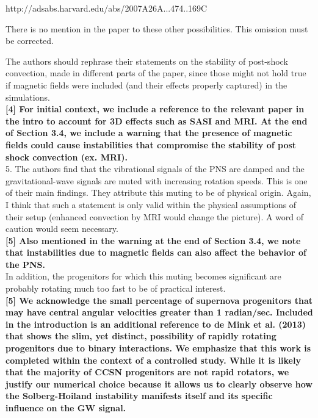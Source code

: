 \documentclass[11pt]{article}
\begin{document}
http://adsabs.harvard.edu/abs/2007A26A...474..169C

There is no mention in the paper to these other possibilities. This omission 
must be corrected.

The authors should rephrase their statements on the stability of post-shock 
convection, made in different parts of the paper, since those might not hold 
true if magnetic fields were included (and their effects properly captured) 
in the simulations.\\

\textbf{[4] For initial context, we include a reference to the relevant paper in the intro to account for 3D effects such as SASI and MRI.   At the end of Section 3.4, we include a warning that the presence of magnetic fields could cause instabilities that compromise the stability of post shock convection (ex. MRI).  }\\

5. The authors find that the vibrational signals of the PNS are damped and 
the gravitational-wave signals are muted with increasing rotation speeds. This
is one of their main findings. They attribute this muting to be of physical origin.
Again, I think that such a statement is only valid within the physical assumptions 
of their setup (enhanced convection by MRI would change the picture). A word of  caution would seem necessary. \\

\textbf{[5] Also mentioned in the warning at the end of Section 3.4, we note that instabilities due to magnetic fields can also affect the behavior of the PNS.}\\

In addition, the progenitors for which this muting becomes significant are probably rotating much too fast to be of practical 
interest. \\

\textbf{[5] We acknowledge the small percentage of supernova progenitors that may have central angular velocities greater than 1 radian/sec.  Included in the introduction is an additional reference to de Mink et al. (2013) that shows the slim, yet distinct, possibility of rapidly rotating progenitors due to binary interactions.  We emphasize that this work is completed within the context of a controlled study.  While it is likely that the majority of CCSN progenitors are not rapid rotators, we justify our numerical choice because it allows us to clearly observe how the Solberg-Hoiland instability manifests itself and its specific influence on the GW signal.}\\
\end{document}
